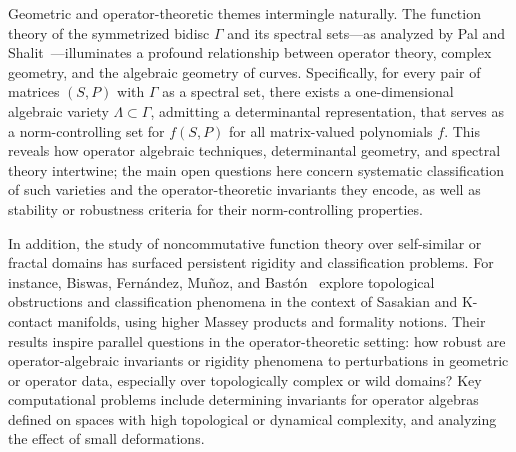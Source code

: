 \documentclass[sigconf]{acmart}
\begin{document}
Geometric and operator-theoretic themes intermingle naturally. The function theory of the symmetrized bidisc $\Gamma$ and its spectral sets---as analyzed by Pal and Shalit~\cite{ref99}---illuminates a profound relationship between operator theory, complex geometry, and the algebraic geometry of curves. Specifically, for every pair of matrices $(S, P)$ with $\Gamma$ as a spectral set, there exists a one-dimensional algebraic variety $\Lambda \subset \Gamma$, admitting a determinantal representation, that serves as a norm-controlling set for $f(S,P)$ for all matrix-valued polynomials $f$. This reveals how operator algebraic techniques, determinantal geometry, and spectral theory intertwine; the main open questions here concern systematic classification of such varieties and the operator-theoretic invariants they encode, as well as stability or robustness criteria for their norm-controlling properties.

In addition, the study of noncommutative function theory over self-similar or fractal domains has surfaced persistent rigidity and classification problems. For instance, Biswas, Fernández, Muñoz, and Bastón~\cite{ref14} explore topological obstructions and classification phenomena in the context of Sasakian and K-contact manifolds, using higher Massey products and formality notions. Their results inspire parallel questions in the operator-theoretic setting: how robust are operator-algebraic invariants or rigidity phenomena to perturbations in geometric or operator data, especially over topologically complex or wild domains? Key computational problems include determining invariants for operator algebras defined on spaces with high topological or dynamical complexity, and analyzing the effect of small deformations.
\end{document}

